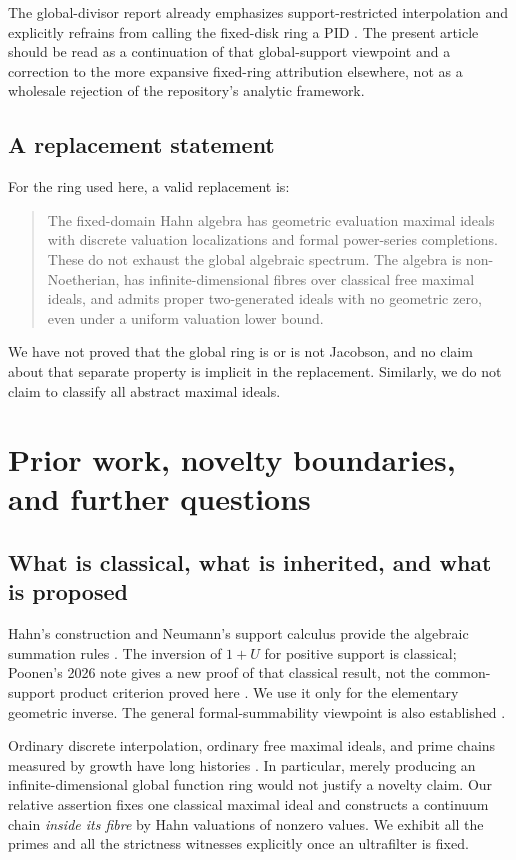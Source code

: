 \documentclass[11pt,letterpaper]{article}
\numberwithin{equation}{section}
\theoremstyle{definition}
\theoremstyle{remark}
\begin{document}
The global-divisor report already emphasizes support-restricted
interpolation and explicitly refrains from calling the fixed-disk ring
a PID \cite{RepoGlobal}. The present article should be read as a
continuation of that global-support viewpoint and a correction to the
more expansive fixed-ring attribution elsewhere, not as a wholesale
rejection of the repository's analytic framework.

\subsection{A replacement statement}
For the ring used here, a valid replacement is:
\begin{quote}
The fixed-domain Hahn algebra has geometric evaluation maximal ideals
with discrete valuation localizations and formal power-series
completions. These do not exhaust the global algebraic spectrum.
The algebra is non-Noetherian, has infinite-dimensional fibres over
classical free maximal ideals, and admits proper two-generated ideals
with no geometric zero, even under a uniform valuation lower bound.
\end{quote}
We have not proved that the global ring is or is not Jacobson, and no
claim about that separate property is implicit in the replacement.
Similarly, we do not claim to classify all abstract maximal ideals.

\section{Prior work, novelty boundaries, and further questions}
\label{sec:prior}

\subsection{What is classical, what is inherited, and what is proposed}
Hahn's construction and Neumann's support calculus provide the algebraic
summation rules \cite{Hahn,Neumann}. The inversion of $1+U$ for positive
support is classical; Poonen's 2026 note gives a new proof of that
classical result, not the common-support product criterion proved here
\cite{Poonen}. We use it only for the elementary geometric inverse.
The general formal-summability viewpoint is also established
\cite{BagayokoEtAl}.

Ordinary discrete interpolation, ordinary free maximal ideals, and
prime chains measured by growth have long histories
\cite{Henriksen52,Henriksen53,KangToan}. In particular, merely producing
an infinite-dimensional global function ring would not justify a
novelty claim. Our relative assertion fixes one classical maximal ideal
and constructs a continuum chain \emph{inside its fibre} by Hahn
valuations of nonzero values. We exhibit all the primes and all the
strictness witnesses explicitly once an ultrafilter is fixed.
\end{document}
